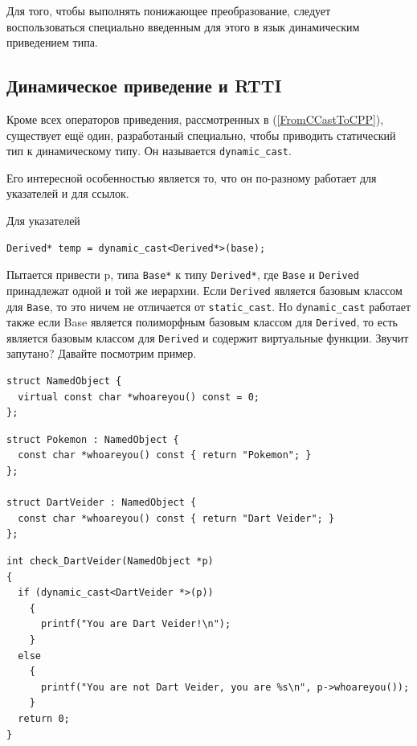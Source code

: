 \documentclass[a4paper,12pt,oneside]{book}
\begin{document}
Для того, чтобы выполнять понижающее преобразование, следует воспользоваться специально введенным для этого в язык динамическим приведением типа.

\subsection{Динамическое приведение и RTTI}\label{DynCastRTTI}

Кроме всех операторов приведения, рассмотренных в (\ref{FromCCastToCPP}), существует ещё один, разработаный специально, чтобы приводить статический тип к динамическому типу. Он называется \lstinline!dynamic_cast!. 

Его интересной особенностью является то, что он по-разному работает для указателей и для ссылок. 

Для указателей

\begin{lstlisting}
Derived* temp = dynamic_cast<Derived*>(base);
\end{lstlisting}

Пытается привести p, типа \lstinline!Base*! к типу \lstinline!Derived*!, где \lstinline!Base! и \lstinline!Derived! принадлежат одной и той же иерархии. Если \lstinline!Derived! является базовым классом для \lstinline!Base!, то это ничем не отличается от \lstinline!static_cast!. Но \lstinline!dynamic_cast! работает также если Base является полиморфным базовым классом для \lstinline!Derived!, то есть является базовым классом для \lstinline!Derived! и содержит виртуальные функции. Звучит запутано? Давайте посмотрим пример.

\begin{lstlisting}
struct NamedObject {
  virtual const char *whoareyou() const = 0;
};
\end{lstlisting}

\begin{lstlisting}
struct Pokemon : NamedObject {
  const char *whoareyou() const { return "Pokemon"; }
};

struct DartVeider : NamedObject {
  const char *whoareyou() const { return "Dart Veider"; }
};
\end{lstlisting}

\begin{lstlisting}
int check_DartVeider(NamedObject *p)
{
  if (dynamic_cast<DartVeider *>(p))
    {
      printf("You are Dart Veider!\n");
    }
  else
    {
      printf("You are not Dart Veider, you are %s\n", p->whoareyou());
    }
  return 0;
}
\end{lstlisting}
\end{document}
